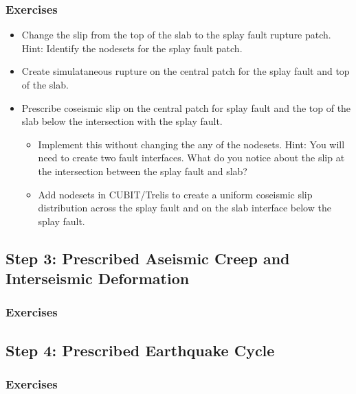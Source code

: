 \subsubsection{Exercises}

\begin{itemize}
\item Change the slip from the top of the slab to the splay fault
  rupture patch. Hint: Identify the nodesets for the splay fault
  patch.
\item Create simulataneous rupture on the central patch for the splay
  fault and top of the slab.
\item Prescribe coseismic slip on the central patch for splay fault
  and the top of the slab below the intersection with the splay fault.
  \begin{itemize}
  \item Implement this without changing the any of the nodesets. Hint:
    You will need to create two fault interfaces. What do you notice
    about the slip at the intersection between the splay fault and slab?
  \item Add nodesets in CUBIT/Trelis to create a uniform coseismic
    slip distribution across the splay fault and on the slab interface
    below the splay fault.
  \end{itemize}
\end{itemize}


\subsection{Step 3: Prescribed Aseismic Creep and Interseismic Deformation}

\subsubsection{Exercises}

\subsection{Step 4: Prescribed Earthquake Cycle}

\subsubsection{Exercises}




